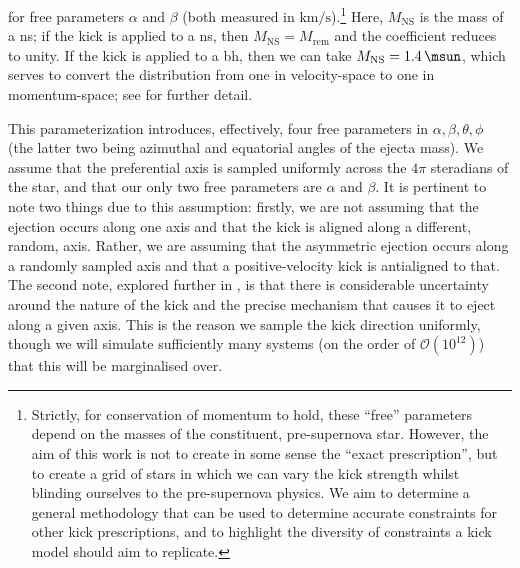 for free parameters $\alpha$ and $\beta$ (both measured in $\si{\km\per\second}$).\footnote{Strictly, for conservation of momentum to hold, these ``free'' parameters depend on the masses of the constituent, pre-supernova star. However, the aim of this work is not to create in some sense the ``exact prescription'', but to create a grid of stars in which we can vary the kick strength whilst blinding ourselves to the pre-supernova physics. We aim to determine a general methodology that can be used to determine accurate constraints for other kick prescriptions, and to highlight the diversity of constraints a kick model should aim to replicate.} Here, $M_\text{NS}$ is the mass of a \gls{ns}; if the kick is applied to a \gls{ns}, then $M_\text{NS}=M_\text{rem}$ and the coefficient reduces to unity. If the kick is applied to a \gls{bh}, then we can take $M_\text{NS}=\SI{1.4}{\msun}$, which serves to convert the distribution from one in velocity-space to one in momentum-space; see \citet{Bray:2016, Bray:2018, Richards:2023} for further detail.

This parameterization introduces, effectively, four free parameters in $\alpha, \beta, \theta, \phi$ (the latter two being azimuthal and equatorial angles of the ejecta mass). We assume that the preferential axis is sampled uniformly across the $4\pi$ steradians of the star, and that our only two free parameters are $\alpha$ and $\beta$. It is pertinent to note two things due to this assumption: firstly, we are not assuming that the ejection occurs along one axis and that the kick is aligned along a different, random, axis. Rather, we are assuming that the asymmetric ejection occurs along a randomly sampled axis and that a positive-velocity kick is antialigned to that. The second note, explored further in , is that there is considerable uncertainty around the nature of the kick and the precise mechanism that causes it to eject along a given axis. This is the reason we sample the kick direction uniformly, though we will simulate sufficiently many systems (on the order of $\mathcal{O}(10^{12})$) that this will be marginalised over.

